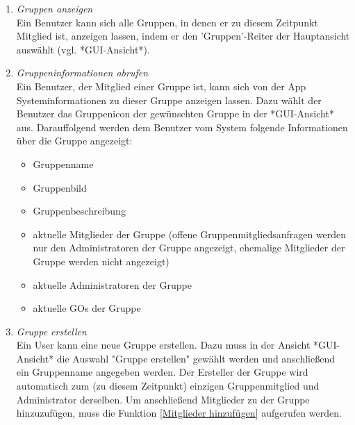 \documentclass[parskip=full]{scrartcl}
\def\threedigits#1{%
  \ifnum#1<100 0\fi
  \ifnum#1<10 0\fi
  \number#1}
\begin{document}
\begin{enumerate}[label={\textbf{/F\protect\threedigits{\theenumi}0/}}, leftmargin=*, resume]
	\item \textit{Gruppen anzeigen} \\ %
	Ein Benutzer kann sich alle Gruppen, in denen er zu diesem Zeitpunkt Mitglied ist, anzeigen lassen, indem er den 'Gruppen'-Reiter der \gls{Hauptansicht} auswählt (vgl. *GUI-Ansicht*).
	
	\item \textit{Gruppeninformationen abrufen} \label{Gruppeninfo anzeigen} \\%
	Ein Benutzer, der Mitglied einer Gruppe ist, kann sich von der App Systeminformationen zu dieser Gruppe anzeigen lassen. Dazu wählt der Benutzer das Gruppenicon der gewünschten Gruppe in der *GUI-Ansicht* aus. Darauffolgend werden dem Benutzer vom System folgende Informationen über die Gruppe angezeigt:
	\begin{itemize}
		\item Gruppenname
		\item \colorbox{shadecolor}{Gruppenbild}
		\item \colorbox{shadecolor}{Gruppenbeschreibung}
		\item aktuelle Mitglieder der Gruppe (offene Gruppenmitgliedsanfragen werden nur den Administratoren der Gruppe angezeigt, ehemalige Mitglieder der Gruppe werden nicht angezeigt)
		\item aktuelle Administratoren der Gruppe
		\item aktuelle \glspl{GO} der Gruppe %
	\end{itemize}
	
	\item \textit{Gruppe erstellen}\\
	Ein User kann eine neue Gruppe erstellen. Dazu muss in der Ansicht *GUI-Ansicht* die Auswahl "Gruppe erstellen" gewählt werden und anschließend ein Gruppenname angegeben werden. Der Ersteller der Gruppe wird automatisch zum (zu diesem Zeitpunkt) einzigen Gruppenmitglied und Administrator derselben. Um anschließend Mitglieder zu der Gruppe hinzuzufügen, muss die Funktion \ref{Mitglieder hinzufügen} aufgerufen werden.
	

\end{enumerate}
\end{document}
